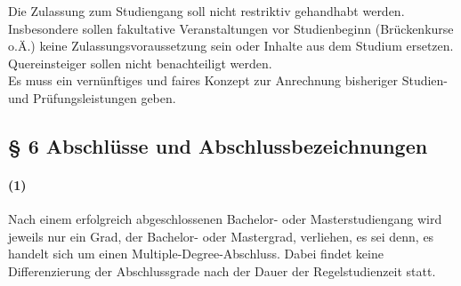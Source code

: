 \documentclass[a4paper]{scrartcl}
\begin{document}
\textcolor{Bernd}{\textbf{\cite{PROT: WiSe2015-RL}} Die Zulassung zum Studiengang soll nicht restriktiv gehandhabt werden. Insbesondere sollen fakultative Veranstaltungen vor Studienbeginn (Brückenkurse o.Ä.) keine Zulassungsvoraussetzung sein oder Inhalte aus dem Studium ersetzen. Quereinsteiger sollen nicht benachteiligt werden.}\\


\textcolor{Bernd}{\textbf{\cite{RESO: SoSe2002-RL}} Es muss ein vernünftiges und faires Konzept zur Anrechnung bisheriger Studien- und Prüfungsleistungen geben.}\\


\subsection{§ 6 Abschlüsse und Abschlussbezeichnungen}
\paragraph{(1)} Nach einem erfolgreich abgeschlossenen Bachelor- oder
Masterstudiengang wird jeweils nur ein Grad, der Bachelor- oder Mastergrad,
verliehen, es sei denn, es handelt sich um einen Multiple-Degree-Abschluss.
Dabei findet keine Differenzierung der Abschlussgrade nach der Dauer der
Regelstudienzeit statt.
\end{document}

